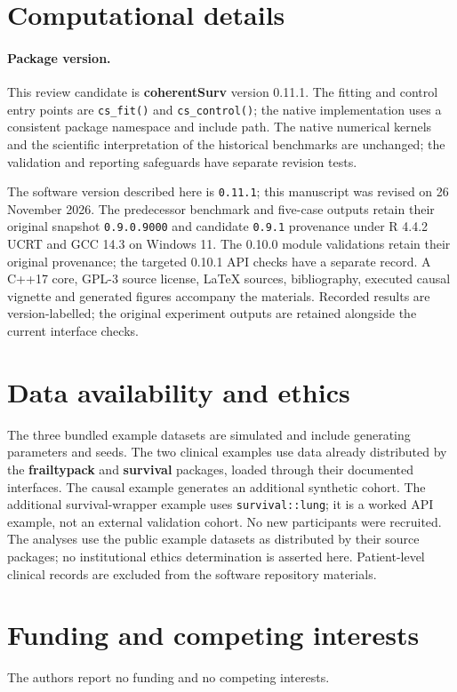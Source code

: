 \documentclass[article,nojss]{jss}
\newcommand{\pkg}[1]{\textbf{#1}}
\newcommand{\proglang}[1]{\textsf{#1}}
\newcommand{\code}[1]{\texttt{#1}}
\begin{document}
\section*{Computational details}

\paragraph{Package version.} This review candidate is \pkg{coherentSurv} version 0.11.1. The fitting and control entry points are \code{cs\_fit()} and \code{cs\_control()}; the native implementation uses a consistent package namespace and include path. The native numerical kernels and the scientific interpretation of the historical benchmarks are unchanged; the validation and reporting safeguards have separate revision tests.


The software version described here is \code{0.11.1}; this manuscript was revised on 26 November 2026. The predecessor benchmark and five-case outputs retain their original snapshot \code{0.9.0.9000} and candidate \code{0.9.1} provenance under \proglang{R} 4.4.2 UCRT and GCC 14.3 on Windows 11. The 0.10.0 module validations retain their original provenance; the targeted 0.10.1 API checks have a separate record. A C++17 core, GPL-3 source license, LaTeX sources, bibliography, executed causal vignette and generated figures accompany the materials. Recorded results are version-labelled; the original experiment outputs are retained alongside the current interface checks.

\section*{Data availability and ethics}
The three bundled example datasets are simulated and include generating parameters and seeds. The two clinical examples use data already distributed by the \pkg{frailtypack} and \pkg{survival} packages, loaded through their documented interfaces. The causal example generates an additional synthetic cohort. The additional survival-wrapper example uses \code{survival::lung}; it is a worked API example, not an external validation cohort. No new participants were recruited. The analyses use the public example datasets as distributed by their source packages; no institutional ethics determination is asserted here. Patient-level clinical records are excluded from the software repository materials.

\section*{Funding and competing interests}
The authors report no funding and no competing interests.

\end{document}
